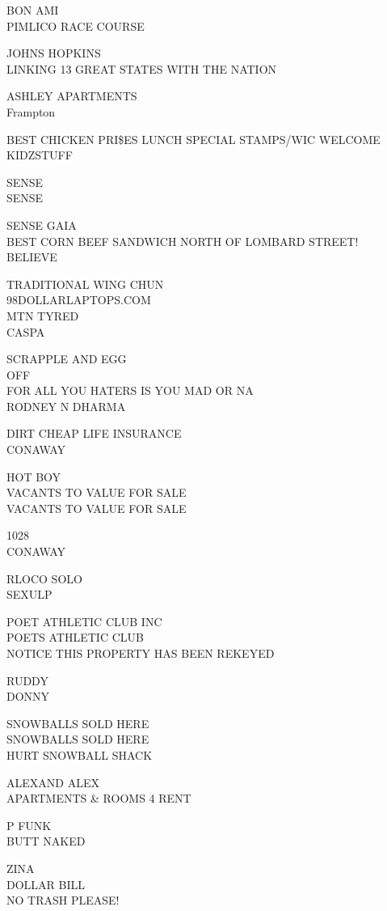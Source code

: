 \documentclass[10pt,letterpaper]{article}
\begin{document}
BON AMI\\
PIMLICO RACE COURSE

JOHNS HOPKINS\\
LINKING 13 GREAT STATES WITH THE NATION

ASHLEY APARTMENTS\\
Frampton

BEST CHICKEN PRI\$ES LUNCH SPECIAL STAMPS/WIC WELCOME\\
KIDZSTUFF

SENSE\\
SENSE

SENSE GAIA\\
BEST CORN BEEF SANDWICH NORTH OF LOMBARD STREET!\\
BELIEVE

TRADITIONAL WING CHUN\\
98DOLLARLAPTOPS.COM\\
MTN TYRED\\
CASPA

SCRAPPLE AND EGG\\
OFF\\
FOR ALL YOU HATERS IS YOU MAD OR NA\\
RODNEY N DHARMA

DIRT CHEAP LIFE INSURANCE\\
CONAWAY

HOT BOY\\
VACANTS TO VALUE FOR SALE\\
VACANTS TO VALUE FOR SALE

1028\\
CONAWAY

RLOCO SOLO\\
SEXULP

POET ATHLETIC CLUB INC\\
POETS ATHLETIC CLUB\\
NOTICE THIS PROPERTY HAS BEEN REKEYED

RUDDY\\
DONNY

SNOWBALLS SOLD HERE\\
SNOWBALLS SOLD HERE\\
HURT SNOWBALL SHACK

ALEXAND ALEX\\
APARTMENTS \& ROOMS 4 RENT

P FUNK\\
BUTT NAKED

ZINA\\
DOLLAR BILL\\
NO TRASH PLEASE!
\end{document}
